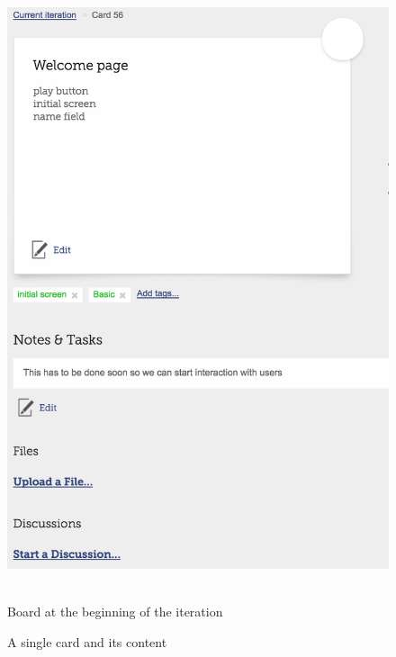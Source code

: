 \documentclass{article}
\renewcommand{\_}{\char`_}
\begin{document}
\begin{figure}[h!]
{                }%
        \else
                \hbox{%
                        \includegraphics[height=\ht0]{card}%
                }%
        \fi
        \noindent
        \parbox{.45\textwidth}{%
                \centering
                \caption{Board at the beginning of the iteration}
                \label{fg:beginning}
        }%
        \hfil
        \parbox{.45\textwidth}{%
                \centering
                \caption{A single card and its content}
                \label{fg:card}
        }%
\end{figure}
\end{document}
